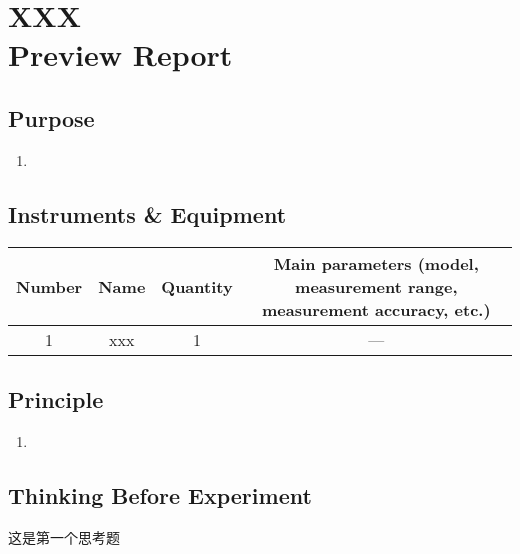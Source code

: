 
\setcounter{section}{0}
\section{XXX \\ Preview Report}


\subsection{Purpose}
\begin{enumerate}
	\item 
\end{enumerate}


\subsection{Instruments \& Equipment}
\begin{table}[htbp]
	\centering
	\renewcommand\arraystretch{1.6}
	\begin{tabular}{|c|c|c|c|}
		\hline
		Number & Name & Quantity & Main parameters (model, measurement range, measurement accuracy, etc.) \\
		\hline
		1 & xxx & 1 & --- \\
		\hline
	\end{tabular}
\end{table}


\subsection{Principle}
\begin{enumerate}
	\item 
\end{enumerate}


\subsection{Thinking Before Experiment}

\begin{question}
	这是第一个思考题
\end{question}

